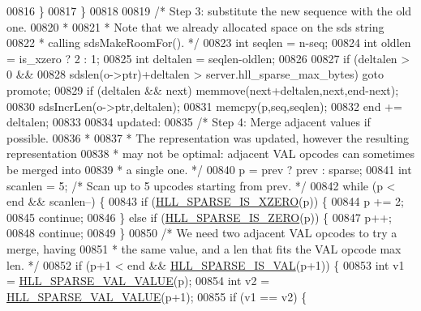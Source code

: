 \begin{DoxyCode}
{{00816         \}
00817     \}
00818 
00819     \textcolor{comment}{/* Step 3: substitute the new sequence with the old one.}
00820 \textcolor{comment}{     *}
00821 \textcolor{comment}{     * Note that we already allocated space on the sds string}
00822 \textcolor{comment}{     * calling sdsMakeRoomFor(). */}
00823      \textcolor{keywordtype}{int} seqlen = n-seq;
00824      \textcolor{keywordtype}{int} oldlen = is\_xzero ? 2 : 1;
00825      \textcolor{keywordtype}{int} deltalen = seqlen-oldlen;
00826 
00827      \textcolor{keywordflow}{if} (deltalen > 0 &&
00828          sdslen(o->ptr)+deltalen > server.hll\_sparse\_max\_bytes) \textcolor{keywordflow}{goto} promote;
00829      \textcolor{keywordflow}{if} (deltalen && next) memmove(next+deltalen,next,end-next);
00830      sdsIncrLen(o->ptr,deltalen);
00831      memcpy(p,seq,seqlen);
00832      end += deltalen;
00833 
00834 updated:
00835     \textcolor{comment}{/* Step 4: Merge adjacent values if possible.}
00836 \textcolor{comment}{     *}
00837 \textcolor{comment}{     * The representation was updated, however the resulting representation}
00838 \textcolor{comment}{     * may not be optimal: adjacent VAL opcodes can sometimes be merged into}
00839 \textcolor{comment}{     * a single one. */}
00840     p = prev ? prev : sparse;
00841     \textcolor{keywordtype}{int} scanlen = 5; \textcolor{comment}{/* Scan up to 5 upcodes starting from prev. */}
00842     \textcolor{keywordflow}{while} (p < end && scanlen--) \{
00843         \textcolor{keywordflow}{if} (\hyperlink{hyperloglog_8c_ac672e0af491e4cbfe7a5859ae4dc74f9}{HLL\_SPARSE\_IS\_XZERO}(p)) \{
00844             p += 2;
00845             \textcolor{keywordflow}{continue};
00846         \} \textcolor{keywordflow}{else} \textcolor{keywordflow}{if} (\hyperlink{hyperloglog_8c_a0b65ae2290df116ae4ed18188dffb5ad}{HLL\_SPARSE\_IS\_ZERO}(p)) \{
00847             p++;
00848             \textcolor{keywordflow}{continue};
00849         \}
00850         \textcolor{comment}{/* We need two adjacent VAL opcodes to try a merge, having}
00851 \textcolor{comment}{         * the same value, and a len that fits the VAL opcode max len. */}
00852         \textcolor{keywordflow}{if} (p+1 < end && \hyperlink{hyperloglog_8c_a14fe08c54ac70efe9d8db79b1b582890}{HLL\_SPARSE\_IS\_VAL}(p+1)) \{
00853             \textcolor{keywordtype}{int} v1 = \hyperlink{hyperloglog_8c_ad36de263468a9ce3b1409743b8da64d7}{HLL\_SPARSE\_VAL\_VALUE}(p);
00854             \textcolor{keywordtype}{int} v2 = \hyperlink{hyperloglog_8c_ad36de263468a9ce3b1409743b8da64d7}{HLL\_SPARSE\_VAL\_VALUE}(p+1);
00855             \textcolor{keywordflow}{if} (v1 == v2) \{
}}
\end{DoxyCode}
